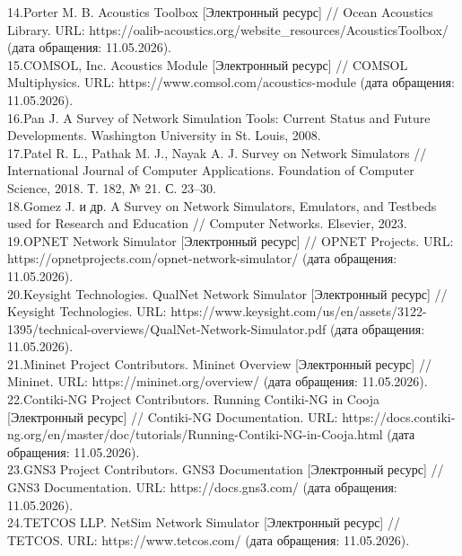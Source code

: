 \documentclass[
    numbers=section,
    document-code={ВКРБ--09.03.04--10.19--XX--26--81}
]{../latex/fqw}
\begin{document}
{        14.Porter M. B. Acoustics Toolbox {[}Электронный ресурс{]} // Ocean
        Acoustics Library. URL:
        https://oalib-acoustics.org/website\_resources/AcousticsToolbox/ (дата
        обращения: 11.05.2026).\\
        15.COMSOL, Inc. Acoustics Module {[}Электронный ресурс{]} // COMSOL
        Multiphysics. URL: https://www.comsol.com/acoustics-module (дата
        обращения: 11.05.2026).\\
        16.Pan J. A Survey of Network Simulation Tools: Current Status and
        Future Developments. Washington University in St. Louis, 2008.\\
        17.Patel R. L., Pathak M. J., Nayak A. J. Survey on Network Simulators
        // International Journal of Computer Applications. Foundation of
        Computer Science, 2018. Т. 182, № 21. С. 23--30.\\
        18.Gomez J. и др. A Survey on Network Simulators, Emulators, and
        Testbeds used for Research and Education // Computer Networks. Elsevier,
        2023.\\
        19.OPNET Network Simulator {[}Электронный ресурс{]} // OPNET Projects.
        URL: https://opnetprojects.com/opnet-network-simulator/ (дата обращения:
        11.05.2026).\\
        20.Keysight Technologies. QualNet Network Simulator {[}Электронный
        ресурс{]} // Keysight Technologies. URL:
        https://www.keysight.com/us/en/assets/3122-1395/technical-overviews/QualNet-Network-Simulator.pdf
        (дата обращения: 11.05.2026).\\
        21.Mininet Project Contributors. Mininet Overview {[}Электронный
        ресурс{]} // Mininet. URL: https://mininet.org/overview/ (дата
        обращения: 11.05.2026).\\
        22.Contiki-NG Project Contributors. Running Contiki-NG in Cooja
            {[}Электронный ресурс{]} // Contiki-NG Documentation. URL:
        https://docs.contiki-ng.org/en/master/doc/tutorials/Running-Contiki-NG-in-Cooja.html
        (дата обращения: 11.05.2026).\\
        23.GNS3 Project Contributors. GNS3 Documentation {[}Электронный
        ресурс{]} // GNS3 Documentation. URL: https://docs.gns3.com/ (дата
        обращения: 11.05.2026).\\
        24.TETCOS LLP. NetSim Network Simulator {[}Электронный ресурс{]} //
        TETCOS. URL: https://www.tetcos.com/ (дата обращения: 11.05.2026).\\
}
\end{document}
